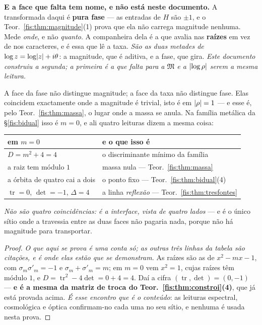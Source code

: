 \documentclass[livro.tex]{subfiles}
\begin{document}
\medskip\noindent\textbf{E a face que falta tem nome, e não está neste
documento.} A transformada daqui é \textbf{pura fase} --- as entradas de $H$ são
$\pm1$, e o Teor.~\ref{fis:thm:magnitude}(1) prova que ela não carrega magnitude
nenhuma. Mede \emph{onde}, e não \emph{quanto}. A companheira dela é a que avalia
nas \textbf{raízes} em vez de nos caracteres, e é essa que lê a taxa. \emph{São as
duas metades de $\log z=\log\lvert z\rvert+i\theta$}: a magnitude, que é aditiva, e a
fase, que gira. \emph{Este documento construiu a segunda; a primeira é a que
falta para a $\mathfrak{M}$ e a $\lvert \log\rho\rvert$ serem a mesma leitura.}

\begin{corolario}\label{fis:cor:encontro}
A face da fase não distingue magnitude; a face da taxa não distingue fase. Elas
coincidem exactamente onde a magnitude é trivial, isto é em $\lvert \rho\rvert=1$ --- e
esse é, pelo Teor.~\ref{fis:thm:massa}, o lugar onde a massa se anula. Na família
metálica da §\ref{fis:bidual} isso é $m=0$, e ali quatro leituras dizem a mesma
coisa:
\begin{center}\small
\begin{tabular}{@{}ll@{}}
\toprule
em $m=0$ & e o que isso é \\
\midrule
$D=m^{2}+4=4$ & o discriminante mínimo da família \\
a raiz tem módulo $1$ & massa nula --- Teor.~\ref{fis:thm:massa} \\
a órbita de quatro cai a dois & o ponto fixo --- Teor.~\ref{fis:thm:bidual}(4) \\
$\operatorname{tr}=0$, $\det=-1$, $\Delta=4$ & a linha \emph{reflexão} --- Teor.~\ref{fis:thm:tresfontes} \\
\bottomrule
\end{tabular}
\end{center}
\emph{Não são quatro coincidências: é a interface, vista de quatro lados} --- e é
o único sítio onde a travessia entre as duas faces não pagaria nada, porque não
há magnitude para transportar.
\end{corolario}

\begin{proof}
\emph{O que aqui se prova é uma conta só; as outras três linhas da tabela são
citações, e é onde elas estão que se demonstram.} As raízes são as de
$x^{2}-mx-1$, com $\sigma_m\sigma'_m=-1$ e $\sigma_m+\sigma'_m=m$; em $m=0$ vem
$x^{2}=1$, cujas raízes têm módulo $1$, e $D=\operatorname{tr}^{2}-4\det=0+4=4$.
Daí a cifra $(\operatorname{tr},\det)=(0,-1)$ --- \textbf{e é a mesma da matriz de
troca do Teor.~\ref{fis:thm:constroi}(4)}, que já está provada acima. \emph{É
esse encontro que é o conteúdo}: as leituras espectral, cosmológica e óptica
confirmam-no cada uma no seu sítio, e nenhuma é usada nesta prova.
\end{proof}
\end{document}
